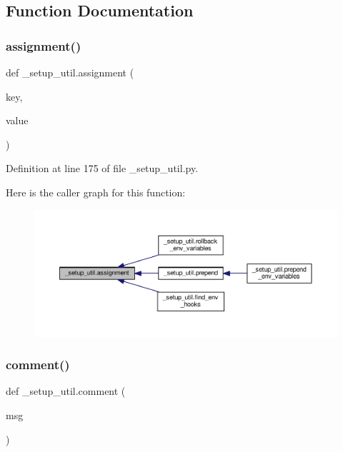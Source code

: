\subsection{Function Documentation}
\mbox{\label{namespace__setup__util_ad56c24837fa4eddc63c03fbc7035628f}} 
\subsubsection{\texorpdfstring{assignment()}{assignment()}}
{\footnotesize\ttfamily def \+\_\+setup\+\_\+util.\+assignment (\begin{DoxyParamCaption}\item[{}]{key,  }\item[{}]{value }\end{DoxyParamCaption})}



Definition at line 175 of file \+\_\+setup\+\_\+util.\+py.

Here is the caller graph for this function\+:
\nopagebreak
\begin{figure}[H]
\begin{center}
\leavevmode
\includegraphics[width=350pt]{namespace__setup__util_ad56c24837fa4eddc63c03fbc7035628f_icgraph}
\end{center}
\end{figure}
\mbox{\label{namespace__setup__util_abe8c95c4cfe8b1374dacd5f91d984353}} 
\subsubsection{\texorpdfstring{comment()}{comment()}}
{\footnotesize\ttfamily def \+\_\+setup\+\_\+util.\+comment (\begin{DoxyParamCaption}\item[{}]{msg }\end{DoxyParamCaption})}



